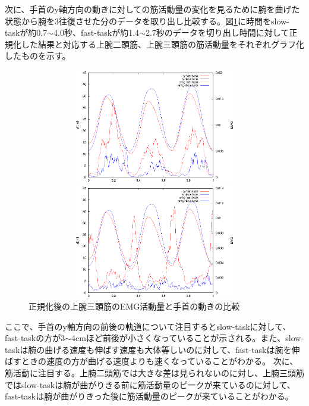 \documentclass{jsarticle}
\begin{document}
\newpage
次に、手首のy軸方向の動きに対しての筋活動量の変化を見るために腕を曲げた状態から腕を3往復させた分のデータを取り出し比較する。図\ref{hikaku4}に時間をslow-taskが約0.7$\sim$4.0秒、fast-taskが約1.4$\sim$2.7秒のデータを切り出し時間に対して正規化した結果と対応する上腕二頭筋、上腕三頭筋の筋活動量をそれぞれグラフ化したものを示す。
\begin{figure}[htb]
  \begin{center}
    \includegraphics[width=17cm,height=5cm]{hikakudata3.eps}

    \includegraphics[width=17cm,height=5cm]{hikakudata4.eps}
    \caption{正規化後の上腕三頭筋のEMG活動量と手首の動きの比較}
    \label{hikaku4}
  \end{center}
\end{figure}



ここで、手首のy軸方向の前後の軌道について注目するとslow-taskに対して、fast-taskの方が3$\sim$4cmほど前後が小さくなっていることが示される。また、slow-taskは腕の曲げる速度も伸ばす速度も大体等しいのに対して、fast-taskは腕を伸ばすときの速度の方が曲げる速度よりも速くなっていることがわかる。
次に、筋活動に注目する。上腕二頭筋では大きな差は見られないのに対し、上腕三頭筋ではslow-taskは腕が曲がりきる前に筋活動量のピークが来ているのに対して、fast-taskは腕が曲がりきった後に筋活動量のピークが来ていることがわかる。
\end{document}
